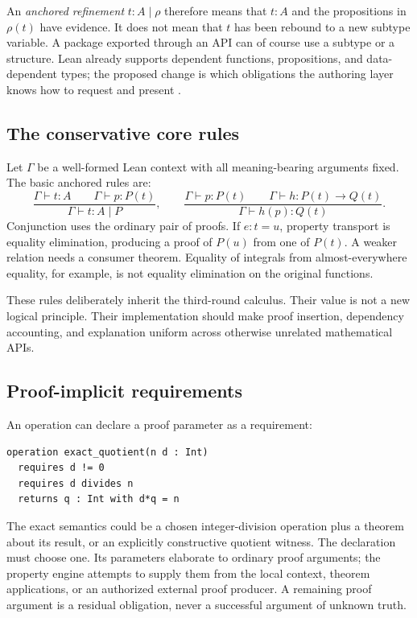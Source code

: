 \documentclass[11pt,a4paper]{article}
\newcommand{\code}[1]{\texttt{\detokenize{#1}}}
\theoremstyle{definition}
\theoremstyle{remark}
\begin{document}
An \emph{anchored refinement} $t:A\mid\rho$ therefore means that $t:A$ and the propositions in $\rho(t)$ have evidence. It does not mean that $t$ has been rebound to a new subtype variable. A package exported through an API can of course use a subtype or a structure. Lean already supports dependent functions, propositions, and data-dependent types; the proposed change is which obligations the authoring layer knows how to request and present \cite{leantypes}.

\subsection{The conservative core rules}
Let $\Gamma$ be a well-formed Lean context with all meaning-bearing arguments fixed. The basic anchored rules are:
\[
 \frac{\Gamma\vdash t:A\qquad\Gamma\vdash p:P(t)}
      {\Gamma\vdash t:A\mid P},\qquad
 \frac{\Gamma\vdash p:P(t)\qquad\Gamma\vdash h:P(t)\to Q(t)}
      {\Gamma\vdash h(p):Q(t)}.
\]
Conjunction uses the ordinary pair of proofs. If $e:t=u$, property transport is equality elimination, producing a proof of $P(u)$ from one of $P(t)$. A weaker relation needs a consumer theorem. Equality of integrals from almost-everywhere equality, for example, is not equality elimination on the original functions.

These rules deliberately inherit the third-round calculus. Their value is not a new logical principle. Their implementation should make proof insertion, dependency accounting, and explanation uniform across otherwise unrelated mathematical APIs.

\subsection{Proof-implicit requirements}
An operation can declare a proof parameter as a requirement:
\begin{lstlisting}
operation exact_quotient(n d : Int)
  requires d != 0
  requires d divides n
  returns q : Int with d*q = n
\end{lstlisting}
The exact semantics could be a chosen integer-division operation plus a theorem about its result, or an explicitly constructive quotient witness. The declaration must choose one. Its \code{requires} parameters elaborate to ordinary proof arguments; the property engine attempts to supply them from the local context, theorem applications, or an authorized external proof producer. A remaining proof argument is a residual obligation, never a successful argument of unknown truth.
\end{document}
